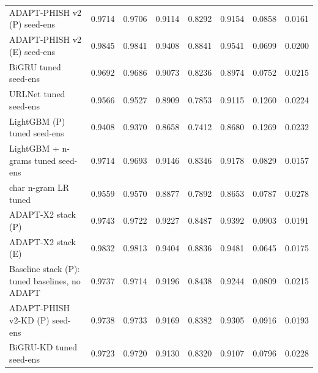 \begin{table}[t]
\begin{tabular}{llrrrrrr}
ADAPT-PHISH v2 (P) seed-ens & 0.9714 & 0.9706 & 0.9114 & 0.8292 & 0.9154 & 0.0858 & 0.0161 \\
ADAPT-PHISH v2 (E) seed-ens & 0.9845 & 0.9841 & 0.9408 & 0.8841 & 0.9541 & 0.0699 & 0.0200 \\
BiGRU tuned seed-ens & 0.9692 & 0.9686 & 0.9073 & 0.8236 & 0.8974 & 0.0752 & 0.0215 \\
URLNet tuned seed-ens & 0.9566 & 0.9527 & 0.8909 & 0.7853 & 0.9115 & 0.1260 & 0.0224 \\
LightGBM (P) tuned seed-ens & 0.9408 & 0.9370 & 0.8658 & 0.7412 & 0.8680 & 0.1269 & 0.0232 \\
LightGBM + n-grams tuned seed-ens & 0.9714 & 0.9693 & 0.9146 & 0.8346 & 0.9178 & 0.0829 & 0.0157 \\
char n-gram LR tuned & 0.9559 & 0.9570 & 0.8877 & 0.7892 & 0.8653 & 0.0787 & 0.0278 \\
ADAPT-X2 stack (P) & 0.9743 & 0.9722 & 0.9227 & 0.8487 & 0.9392 & 0.0903 & 0.0191 \\
ADAPT-X2 stack (E) & 0.9832 & 0.9813 & 0.9404 & 0.8836 & 0.9481 & 0.0645 & 0.0175 \\
Baseline stack (P): tuned baselines, no ADAPT & 0.9737 & 0.9714 & 0.9196 & 0.8438 & 0.9244 & 0.0809 & 0.0215 \\
ADAPT-PHISH v2-KD (P) seed-ens & 0.9738 & 0.9733 & 0.9169 & 0.8382 & 0.9305 & 0.0916 & 0.0193 \\
BiGRU-KD tuned seed-ens & 0.9723 & 0.9720 & 0.9130 & 0.8320 & 0.9107 & 0.0796 & 0.0228 \\
\bottomrule
\end{tabular}
\end{table}